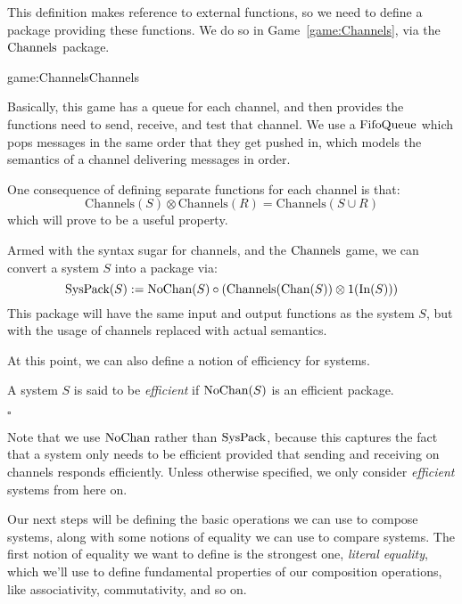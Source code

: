 This definition makes reference to external functions,
so we need to define a package providing these functions.
We do so in Game~\ref{game:Channels},
via the $\text{Channels}$ package.

\begin{game}{game:Channels}{Channels}
\end{game}

Basically, this game has a queue for each channel, and then provides
the functions need to send, receive, and test that channel.
We use a $\text{FifoQueue}$ which pops messages in the same order
that they get pushed in, which models the semantics of
a channel delivering messages in order.

One consequence of defining separate functions for each channel
is that:
$$
\text{Channels}(S) \otimes \text{Channels}(R) = \text{Channels}(S \cup R)
$$
which will prove to be a useful property.

Armed with the syntax sugar for channels, and the $\text{Channels}$ game,
we can convert a system $S$ into a package via:
$$
\text{SysPack}(S) := \text{NoChan}(S) \circ (\text{Channels}(\text{Chan}(S)) \otimes 1(\text{In}(S)))
$$
This package will have the same input and output functions as the system $S$,
but with the usage of channels replaced with actual semantics.

At this point, we can also define a notion of efficiency for systems.

\begin{definition}
  A system $S$ is said to be \emph{efficient} if $\text{NoChan}(S)$
  is an efficient package.

  $\square$
\end{definition}

Note that we use $\text{NoChan}$ rather than $\text{SysPack}$,
because this captures the fact that a system only needs to be efficient
provided that sending and receiving on channels responds efficiently.
Unless otherwise specified, we only consider \emph{efficient} systems
from here on.

Our next steps will be defining the basic operations we can use
to compose systems, along with some notions of equality we
can use to compare systems.
The first notion of equality we want to define is the strongest
one, \emph{literal equality}, 
which we'll use to define fundamental properties of our composition
operations, like associativity, commutativity, and so on.

